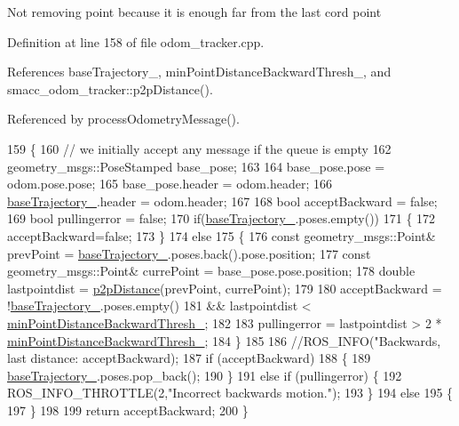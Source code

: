 Not removing point because it is enough far from the last cord point 

Definition at line 158 of file odom\+\_\+tracker.\+cpp.



References base\+Trajectory\+\_\+, min\+Point\+Distance\+Backward\+Thresh\+\_\+, and smacc\+\_\+odom\+\_\+tracker\+::p2p\+Distance().



Referenced by process\+Odometry\+Message().


\begin{DoxyCode}
159 \{
160     \textcolor{comment}{// we initially accept any message if the queue is empty   }
162 \textcolor{comment}{}    geometry\_msgs::PoseStamped base\_pose;
163     
164     base\_pose.pose = odom.pose.pose;
165     base\_pose.header = odom.header;
166     \hyperlink{classsmacc__odom__tracker_1_1OdomTracker_ac3a17be46ab833632c5f63e75c840dc7}{baseTrajectory\_}.header = odom.header;
167 
168     \textcolor{keywordtype}{bool} acceptBackward = \textcolor{keyword}{false};
169     \textcolor{keywordtype}{bool} pullingerror = \textcolor{keyword}{false};
170     \textcolor{keywordflow}{if}(\hyperlink{classsmacc__odom__tracker_1_1OdomTracker_ac3a17be46ab833632c5f63e75c840dc7}{baseTrajectory\_}.poses.empty())
171     \{
172         acceptBackward=\textcolor{keyword}{false};
173     \}
174     \textcolor{keywordflow}{else}
175     \{
176         \textcolor{keyword}{const} geometry\_msgs::Point& prevPoint = \hyperlink{classsmacc__odom__tracker_1_1OdomTracker_ac3a17be46ab833632c5f63e75c840dc7}{baseTrajectory\_}.poses.back().pose.position;
177         \textcolor{keyword}{const} geometry\_msgs::Point& currePoint = base\_pose.pose.position;
178         \textcolor{keywordtype}{double} lastpointdist = \hyperlink{namespacesmacc__odom__tracker_a93496d9bf987249b884e9b0e60778a11}{p2pDistance}(prevPoint, currePoint);
179         
180         acceptBackward = !\hyperlink{classsmacc__odom__tracker_1_1OdomTracker_ac3a17be46ab833632c5f63e75c840dc7}{baseTrajectory\_}.poses.empty() 
181                         && lastpointdist < \hyperlink{classsmacc__odom__tracker_1_1OdomTracker_a79d94520c5da1852602aaf264377a82f}{minPointDistanceBackwardThresh\_};
182 
183         pullingerror = lastpointdist > 2 * \hyperlink{classsmacc__odom__tracker_1_1OdomTracker_a79d94520c5da1852602aaf264377a82f}{minPointDistanceBackwardThresh\_};
184     \}
185 
186     \textcolor{comment}{//ROS\_INFO("Backwards, last distance: %
       acceptBackward);}
187     \textcolor{keywordflow}{if} (acceptBackward) 
188     \{
189         \hyperlink{classsmacc__odom__tracker_1_1OdomTracker_ac3a17be46ab833632c5f63e75c840dc7}{baseTrajectory\_}.poses.pop\_back();
190     \} 
191     \textcolor{keywordflow}{else} \textcolor{keywordflow}{if} (pullingerror) \{
192         ROS\_INFO\_THROTTLE(2,\textcolor{stringliteral}{"Incorrect backwards motion."});
193     \} 
194     \textcolor{keywordflow}{else} 
195     \{
197     \}
198 
199     \textcolor{keywordflow}{return} acceptBackward;
200 \}
\end{DoxyCode}


